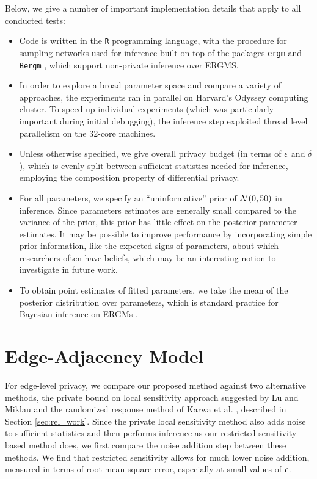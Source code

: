 Below, we give a number of important implementation details that apply to all conducted tests:
\begin{itemize}
	\item Code is written in the \texttt{R} programming language, with the procedure for sampling networks used for inference built on top of the packages \texttt{ergm} \cite{ergm} and \texttt{Bergm} \cite{Bergm}, which support non-private inference over ERGMS.
	\item In order to explore a broad parameter space and compare a variety of approaches, the experiments ran in parallel on Harvard's Odyssey computing cluster. To speed up individual experiments (which was particularly important during initial debugging), the  inference step exploited thread level parallelism  on the 32-core machines.
	\item Unless otherwise specified, we give overall privacy budget (in terms of $\epsilon$ and $\delta$), which is evenly split between sufficient statistics needed for inference, employing the composition property of differential privacy.
	\item For all parameters, we specify an ``uninformative'' prior of $\mathcal{N}(0, 50)$ in inference. Since parameters estimates are generally small compared to the variance of the prior, this prior has little effect on the posterior parameter estimates.  It may be possible to improve performance by incorporating simple prior information, like the expected signs of parameters, about which researchers often have beliefs, which may be an interesting notion to investigate in future work.
	\item To obtain point estimates of fitted parameters, we take the mean of the posterior distribution over parameters, which is standard practice for Bayesian inference on ERGMs \cite{CF11}.
\end{itemize}
 
 \section{Edge-Adjacency Model}
 
For edge-level privacy, we compare our proposed method against two alternative methods, the private bound on local sensitivity approach suggested by Lu and Miklau \cite{LM14} and the randomized response method of Karwa et al. \cite{KKS17}, described in Section \ref{sec:rel_work}. Since the private local sensitivity method also adds noise to sufficient statistics and then performs inference as our restricted sensitivity-based method does, we first compare the noise addition step between these methods. We find that restricted sensitivity allows for much lower noise addition, measured in terms of root-mean-square error, especially at small values of $\epsilon$. 

